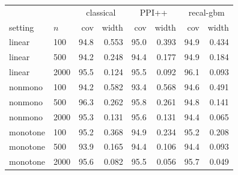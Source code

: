 \begin{tabular}{llrrrrrr}\toprule
 & & \multicolumn{2}{c}{classical} & \multicolumn{2}{c}{PPI++} & \multicolumn{2}{c}{recal-gbm}\\
setting & $n$ & cov & width & cov & width & cov & width\\\midrule
linear & 100 & 94.8 & 0.553 & 95.0 & 0.393 & 94.9 & 0.434\\
linear & 500 & 94.2 & 0.248 & 94.4 & 0.177 & 94.9 & 0.184\\
linear & 2000 & 95.5 & 0.124 & 95.5 & 0.092 & 96.1 & 0.093\\
nonmono & 100 & 94.2 & 0.582 & 93.4 & 0.568 & 94.6 & 0.491\\
nonmono & 500 & 96.3 & 0.262 & 95.8 & 0.261 & 94.8 & 0.141\\
nonmono & 2000 & 95.3 & 0.131 & 95.6 & 0.131 & 94.4 & 0.065\\
monotone & 100 & 95.2 & 0.368 & 94.9 & 0.234 & 95.2 & 0.208\\
monotone & 500 & 93.9 & 0.165 & 94.4 & 0.106 & 94.4 & 0.093\\
monotone & 2000 & 95.6 & 0.082 & 95.5 & 0.056 & 95.7 & 0.049\\
\bottomrule\end{tabular}
